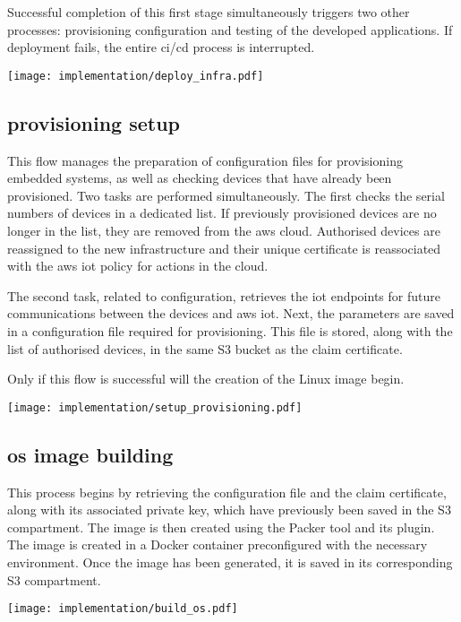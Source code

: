 Successful completion of this first stage simultaneously triggers two other processes: provisioning configuration and testing of the developed applications. If deployment fails, the entire \acrshort{ci}/\acrshort{cd} process is interrupted.
\begin{center}
    \begingroup
    \texttt{[image: implementation/deploy\_infra.pdf]}
    \label{fig:deploy_infra}
    \endgroup
\end{center}

\subsection{\Gls{provisioning} setup}
This flow manages the preparation of configuration files for provisioning embedded systems, as well as checking devices that have already been provisioned. Two tasks are performed simultaneously. The first checks the serial numbers of devices in a dedicated list. If previously provisioned devices are no longer in the list, they are removed from the \gls{aws} \gls{cloud}. Authorised devices are reassigned to the new infrastructure and their unique certificate is reassociated with the \gls{aws} \acrshort{iot} policy for actions in the \gls{cloud}.

The second task, related to configuration, retrieves the \acrshort{iot} endpoints for future communications between the devices and \gls{aws} \acrshort{iot}. Next, the parameters are saved in a configuration file required for provisioning. This file is stored, along with the list of authorised devices, in the same S3 bucket as the claim certificate.

Only if this flow is successful will the creation of the Linux image begin.
\begin{center}
    \begingroup
    \texttt{[image: implementation/setup\_provisioning.pdf]}
    \label{fig:setup_provisioning}
    \endgroup
\end{center}

\subsection{\acrshort{os} image building}
This process begins by retrieving the configuration file and the claim certificate, along with its associated private key, which have previously been saved in the S3 compartment. The image is then created using the Packer tool and its plugin. The image is created in a Docker container preconfigured with the necessary environment. Once the image has been generated, it is saved in its corresponding S3 compartment.
\begin{center}
    \begingroup
    \texttt{[image: implementation/build\_os.pdf]}
    \label{fig:build_os}
    \endgroup
\end{center}

